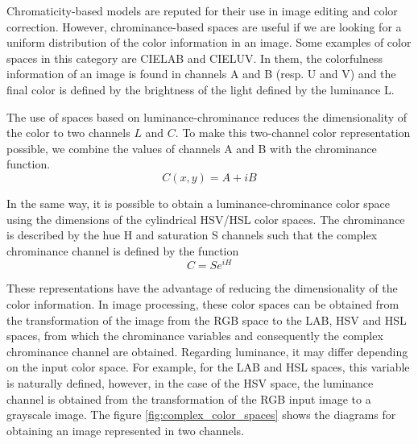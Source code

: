 Chromaticity-based models are reputed for their use in image editing and color correction. However, chrominance-based spaces are useful if we are looking for a uniform distribution of the color information in an image. Some examples of color spaces in this category are CIELAB and CIELUV. In them, the colorfulness information of an image is found in channels A and B (resp. U and V) and the final color is defined by the brightness of the light defined by the luminance L.

The use of spaces based on luminance-chrominance reduces the dimensionality of the color to two channels $L$ and $C$. To make this two-channel color representation possible, we combine the values of channels A and B with the chrominance function.
\begin{equation}\label{eq:chrominance_lab}
    C(x,y) = A + iB
\end{equation}

In the same way, it is possible to obtain a luminance-chrominance color space using the dimensions of the cylindrical HSV/HSL color spaces. The chrominance is described by the hue H and saturation S channels such that the complex chrominance channel is defined by the function
\begin{equation}\label{eq:chrominance_hsv}
    C = S e^{iH}
\end{equation}

These representations have the advantage of reducing the dimensionality of the color information. In image processing, these color spaces can be obtained from the transformation of the image from the RGB space to the LAB, HSV and HSL spaces, from which the chrominance variables and consequently the complex chrominance channel are obtained. Regarding luminance, it may differ depending on the input color space. For example, for the LAB and HSL spaces, this variable is naturally defined, however, in the case of the HSV space, the luminance channel is obtained from the transformation of the RGB input image to a grayscale image. The figure \ref{fig:complex_color_spaces} shows the diagrams for obtaining an image represented in two channels.


